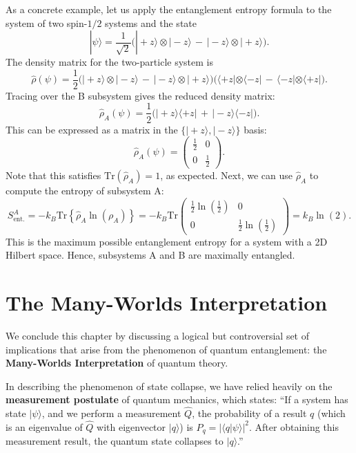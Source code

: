 \documentclass[pra,11pt]{revtex4}
\begin{document}
As a concrete example, let us apply the entanglement entropy formula
to the system of two spin-$1/2$ systems and the state
$$|\psi\rangle = \frac{1}{\sqrt{2}} \Big(|\!+\!z\rangle\otimes|\!-\!z\rangle \,-\, |\!-\!z\rangle\otimes|\!+\!z\rangle\Big).$$
The density matrix for the two-particle system is
$$\hat{\rho}(\psi) = \frac{1}{2} \Big(|\!+\!z\rangle\otimes|\!-\!z\rangle \,-\, |\!-\!z\rangle\otimes|\!+\!z\rangle\Big) \Big(\langle+z|\otimes\langle-z| \,-\, \langle-z|\otimes\langle+z|\Big).$$
Tracing over the B subsystem gives the reduced density matrix:
$$\hat{\rho}_A(\psi) = \frac{1}{2} \Big(|\!+\!z\rangle \langle+z| \,+\, |\!-\!z\rangle \langle-z|\Big).$$
This can be expressed as a matrix in the
$\{|\!+z\rangle,|\!-z\rangle\}$ basis:
$$\hat{\rho}_A(\psi) = \begin{pmatrix}\frac{1}{2} & 0 \\ 0 & \frac{1}{2}\end{pmatrix}.$$
Note that this satisfies $\mathrm{Tr}(\hat\rho_A) = 1$, as expected.
Next, we can use $\hat{\rho}_A$ to compute the entropy of subsystem A:
$$S_{\mathrm{ent.}}^A = -k_B\mathrm{Tr}\left\{\hat{\rho}_A\ln(\rho_A)\right\} = -k_B\mathrm{Tr}\begin{pmatrix}\frac{1}{2}\ln\left(\frac{1}{2}\right) & 0 \\ 0 & \frac{1}{2}\ln\left(\frac{1}{2}\right)\end{pmatrix} = k_B\ln(2).$$
This is the maximum possible entanglement entropy for a system with a
2D Hilbert space.  Hence, subsystems A and B are maximally entangled.

\section{The Many-Worlds Interpretation}

We conclude this chapter by discussing a logical but controversial set
of implications that arise from the phenomenon of quantum
entanglement: the \textbf{Many-Worlds Interpretation} of quantum
theory.

In describing the phenomenon of state collapse, we have relied heavily
on the \textbf{measurement postulate} of quantum mechanics, which
states: ``If a system has state $|\psi\rangle$, and we perform a
measurement $\hat{Q}$, the probability of a result $q$ (which is an
eigenvalue of $\hat{Q}$ with eigenvector $|q\rangle$) is $P_q =
|\langle q | \psi\rangle|^2$.  After obtaining this measurement
result, the quantum state collapses to $|q\rangle$.''
\end{document}
